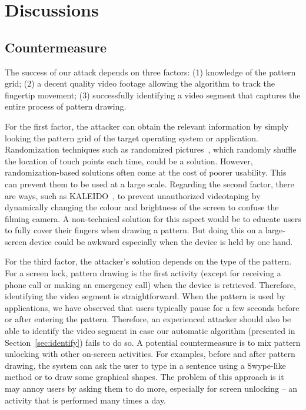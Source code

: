 

\section{Discussions}

\subsection{Countermeasure}

The success of our attack depends on three factors: (1)
knowledge of the pattern grid; (2) a decent
quality video footage allowing the algorithm to track the fingertip movement;
(3) successfully identifying a video segment that captures the entire process of pattern drawing.

For the first factor, the attacker can obtain the relevant information by simply looking the pattern grid
of the target operating system or application.
Randomization techniques such as
randomized pictures~\cite{biddle2012graphical,hossein2015fortifying}, which randomly shuffle the location
of touch points each time, could be a solution.
However, randomization-based solutions often come at the cost of poorer
usability. This can prevent them to be used at a large scale.
Regarding the second factor, there are ways, such as
KALEIDO~\cite{zhang2015kaleido}, to prevent unauthorized videotaping by
dynamically changing the colour and brightness of the screen to confuse the
filming camera. A non-technical solution for this aspect would be to educate users to
fully cover their fingers when drawing a pattern. But doing this on a large-screen device could be awkward especially when the device is held by one hand.



For the third factor, the attacker's solution depends on the type of the
pattern. For a screen lock, pattern drawing is the first activity (except for
receiving a phone call or making an emergency call) when the device is
retrieved. Therefore, identifying the video segment is straightforward. When
the pattern is used by applications, we have observed that users typically
pause for a few seconds before or after entering the pattern. Therefore, an
experienced attacker should also be able to identify the video segment in
case our automatic algorithm (presented in Section~\ref{sec:identify}) fails
to do so. A potential countermeasure is to mix pattern unlocking with other
on-screen activities. For examples, before and after pattern drawing, the
system can ask the user to type in a sentence using a Swype-like method or to
draw some graphical shapes. The problem of this approach is it may annoy
users by asking them to do more, especially for screen unlocking -- an
activity that is performed
many times a day.

